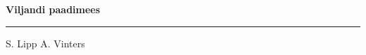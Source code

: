 \documentclass[10pt]{book}
\begin{document}
{
  \samepage
  \raggedbottom
  \raggedright
  \sloppy


  \vspace{0.2in}

  \noindent\begin{minipage}{.1\textwidth}
    \hfill\vspace{0.1in}
  \end{minipage}%
  \noindent\begin{minipage}{.8\textwidth}
    \centering
    \bfseries
    \large Viljandi paadimees
  \end{minipage}%
  \noindent\begin{minipage}{.1\textwidth}
      \hfill\vspace{0.1in}
  \end{minipage}

  \nopagebreak[4]
  \vspace{0.1in}
  \nopagebreak[4]
  \hrule height 0.05ex
  \nopagebreak[4]
  \vspace{-0.05in}

  {\footnotesize S. Lipp \hfill A. Vinters }\\
  \vspace{0.01in}



}
\end{document}
